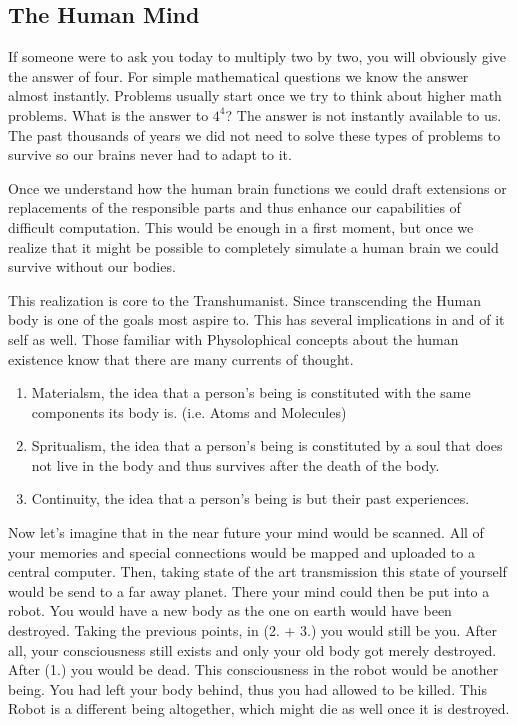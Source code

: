 \documentclass[
			12pt,
			a4paper,
			cleardoublepage=empty,
			final,
			twoside
				]{scrbook}
\begin{document}
    \subsection{The Human Mind}
      \begin{par}
	      If someone were to ask you today to multiply two by two, you will obviously give the answer of four. For simple mathematical questions we know the answer almost instantly. Problems usually start once we try to think about higher math problems. What is the answer to $4^4$? The answer is not instantly available to us. The past thousands of years we did not need to solve these types of problems to survive so our brains never had to adapt to it.
      \end{par}
      \begin{par}
	      Once we understand how the human brain functions we could draft extensions or replacements of the responsible parts and thus enhance our capabilities of difficult computation. This would be enough in a first moment, but once we realize that it might be possible to completely simulate a human brain we could survive without our bodies.\cite{FutureMinds}
      \end{par}
      \begin{par}
	This realization is core to the Transhumanist. Since transcending the Human body is one of the goals most aspire to. This has several implications in and of it self as well. Those familiar with Physolophical concepts about the human existence know that there are many currents of thought. 
      \end{par}
      \begin{enumerate}
	      \item Materialsm, the idea that a person's being is constituted with the same components its body is. (i.e. Atoms and Molecules)
	      \item Spritualism, the idea that a person's being is constituted by a soul that does not live in the body and thus survives after the death of the body.
	      \item Continuity, the idea that a person's being is but their past experiences. 
      \end{enumerate}
      \begin{par}
	      Now let's imagine that in the near future your mind would be scanned. All of your memories and special connections would be mapped and uploaded to a central computer. Then, taking state of the art transmission this state of yourself would be send to a far away planet. There your mind could then be put into a robot. You would have a new body as the one on earth would have been destroyed. Taking the previous points, in (2. + 3.) you would still be you. After all, your consciousness still exists and only your old body got merely destroyed. After (1.) you would be dead. This consciousness in the robot would be another being. You had left your body behind, thus you had allowed to be killed. This Robot is a different being altogether, which might die as well once it is destroyed.
      \end{par}
\end{document}

